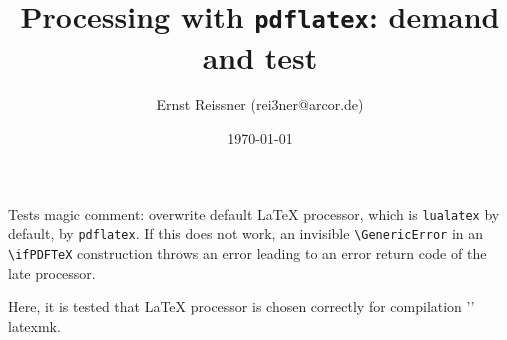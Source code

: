 \documentclass[a4paper,english]{article}
\title{Processing with \texttt{pdflatex}: demand and test}
\author{Ernst Reissner (rei3ner@arcor.de)}
\date{\today}
\begin{document}
\maketitle



Tests magic comment: overwrite default \LaTeX{} processor, 
which is \texttt{lualatex} by default, by \texttt{pdflatex}. 
If this does not work, an invisible \texttt{\textbackslash{}GenericError} 
in an \texttt{\textbackslash{}ifPDFTeX} construction throws an error leading to an error return code 
of the late processor. 
\ifPDFTeX%
\else
  \ifLuaTeX%
  \else
    \ifXeTeX%
    \else
    \fi
  \fi
\fi

Here, it is tested that \LaTeX{} processor is chosen correctly for compilation '\jobname' 
 latexmk. 
\end{document}
